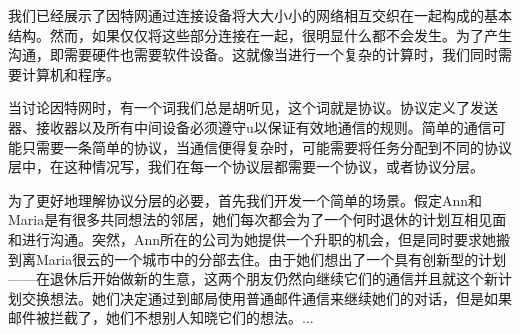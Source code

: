 我们已经展示了因特网通过连接设备将大大小小的网络相互交织在一起构成的基本结构。然而，如果仅仅将这些部分连接在一起，很明显什么都不会发生。为了产生沟通，即需要硬件也需要软件设备。这就像当进行一个复杂的计算时，我们同时需要计算机和程序。

当讨论因特网时，有一个词我们总是胡听见，这个词就是协议。协议定义了发送器、接收器以及所有中间设备必须遵守u以保证有效地通信的规则。简单的通信可能只需要一条简单的协议，当通信便得复杂时，可能需要将任务分配到不同的协议层中，在这种情况写，我们在每一个协议层都需要一个协议，或者协议分层。

为了更好地理解协议分层的必要，首先我们开发一个简单的场景。假定Ann和Maria是有很多共同想法的邻居，她们每次都会为了一个何时退休的计划互相见面和进行沟通。突然，Ann所在的公司为她提供一个升职的机会，但是同时要求她搬到离Maria很云的一个城市中的分部去住。由于她们想出了一个具有创新型的计划——在退休后开始做新的生意，这两个朋友仍然向继续它们的通信并且就这个新计划交换想法。她们决定通过到邮局使用普通邮件通信来继续她们的对话，但是如果邮件被拦截了，她们不想别人知晓它们的想法。...
